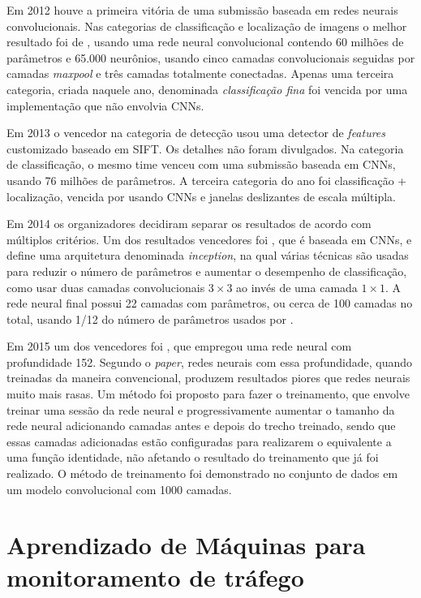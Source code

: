 Em 2012 houve a primeira vitória de uma submissão baseada em redes neurais
convolucionais. Nas categorias de classificação e localização de imagens o
melhor resultado foi de , usando uma
rede neural convolucional contendo 60 milhões de parâmetros e 65.000
neurônios, usando cinco camadas
convolucionais seguidas por camadas \emph{maxpool} e três camadas totalmente
conectadas. Apenas uma terceira categoria, criada naquele ano, denominada
\emph{classificação fina} foi vencida por uma implementação que não envolvia
CNNs.

Em 2013 o vencedor na categoria de detecção usou uma detector de
\emph{features}
customizado baseado em SIFT. Os detalhes não foram divulgados. Na categoria de
classificação, o mesmo time venceu com uma submissão baseada em CNNs, usando
76 milhões de parâmetros. A terceira categoria do ano foi classificação +
localização, vencida por  usando CNNs e
janelas deslizantes de escala múltipla.

Em 2014 os organizadores decidiram separar os resultados de acordo com
múltiplos critérios. Um dos resultados vencedores foi
, que é baseada em CNNs, e define uma arquitetura
denominada \emph{inception}, na qual várias técnicas são usadas para reduzir o
número de parâmetros e aumentar o desempenho de classificação, como usar
duas camadas convolucionais $3 \times 3$ ao invés de uma camada $1 \times 1$. A
rede neural final possui 22 camadas com parâmetros, ou cerca de 100 camadas no
total, usando 1/12 do número de parâmetros usados por
.

Em 2015 um dos vencedores foi , que empregou uma rede
neural com profundidade 152. Segundo o \emph{paper}, redes neurais com essa
profundidade,
quando treinadas da maneira convencional, produzem resultados piores que redes
neurais muito mais rasas. Um método foi proposto para fazer o treinamento, que
envolve treinar uma sessão da rede neural e progressivamente aumentar o tamanho
da rede neural adicionando camadas antes e depois do trecho treinado, sendo que
essas camadas adicionadas estão configuradas para realizarem o equivalente a
uma função identidade, não afetando o resultado do treinamento que já foi
realizado. O método de treinamento foi demonstrado no conjunto de dados
 em um modelo
convolucional com 1000 camadas.

\section{Aprendizado de Máquinas para monitoramento de tráfego}
	\label{sec:cap3_ml_trafego}

